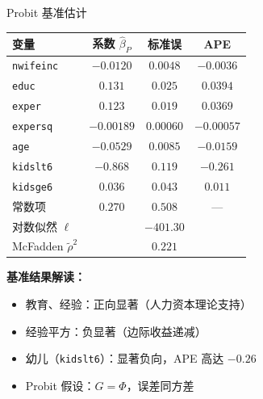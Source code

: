 \documentclass[aspectratio=169, 10pt]{beamer}
\begin{document}
\begin{frame}{Probit 基准估计}

  \begin{center}\footnotesize
  \begin{tabular}{l|c|c|c}
  \hline
  变量 & 系数 $\hat\beta_P$ & 标准误 & APE \\
  \hline
  \texttt{nwifeinc} & $-0.0120$ & $0.0048$ & $-0.0036$ \\
  \texttt{educ} & $0.131$ & $0.025$ & $0.0394$ \\
  \texttt{exper} & $0.123$ & $0.019$ & $0.0369$ \\
  \texttt{expersq} & $-0.00189$ & $0.00060$ & $-0.00057$ \\
  \texttt{age} & $-0.0529$ & $0.0085$ & $-0.0159$ \\
  \texttt{kidslt6} & $-0.868$ & $0.119$ & $-0.261$ \\
  \texttt{kidsge6} & $0.036$ & $0.043$ & $0.011$ \\
  常数项 & $0.270$ & $0.508$ & --- \\
  \hline
  对数似然 $\ell$ & \multicolumn{3}{c}{$-401.30$} \\
  McFadden $\tilde\rho^2$ & \multicolumn{3}{c}{$0.221$} \\
  \hline
  \end{tabular}
  \end{center}

  \begin{highlightbox}
    \textbf{基准结果解读：}
    \begin{itemize}\setlength{\itemsep}{1pt}
      \item 教育、经验：正向显著（人力资本理论支持）
      \item 经验平方：负显著（边际收益递减）
      \item 幼儿（\texttt{kidslt6}）：显著负向，APE 高达 $-0.26$
      \item Probit 假设：$G = \Phi$，误差同方差
    \end{itemize}
  \end{highlightbox}

\end{frame}
\end{document}
